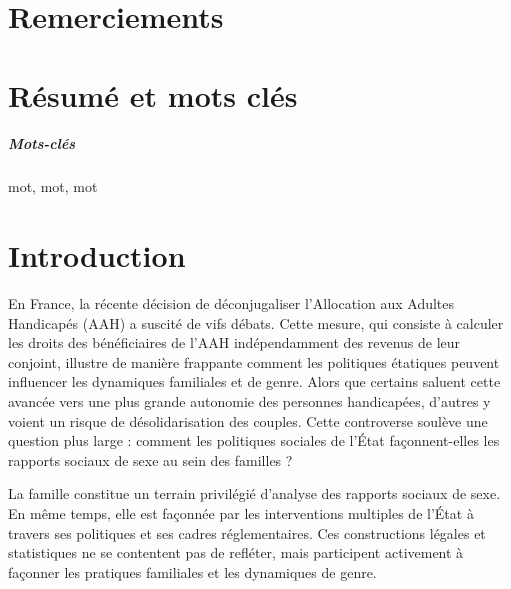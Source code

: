 \documentclass[
  12pt,
]{book}
\author{}
\date{\vspace{-2.5em}}
\begin{document}
\frontmatter

\mainmatter
\makethesistitle

\thispagestyle{empty}

\chapter*{Remerciements}
\blindtext

\chapter*{Résumé et mots clés}
\blindtext
\paragraph{Mots-clés}

mot, mot, mot

\tableofcontents
{}

\newpage

\chapter{Introduction}\label{introduction}

En France, la récente décision de déconjugaliser l'Allocation aux
Adultes Handicapés (AAH) a suscité de vifs débats. Cette mesure, qui
consiste à calculer les droits des bénéficiaires de l'AAH indépendamment
des revenus de leur conjoint, illustre de manière frappante comment les
politiques étatiques peuvent influencer les dynamiques familiales et de
genre. Alors que certains saluent cette avancée vers une plus grande
autonomie des personnes handicapées, d'autres y voient un risque de
désolidarisation des couples. Cette controverse soulève une question
plus large : comment les politiques sociales de l'État façonnent-elles
les rapports sociaux de sexe au sein des familles ?

La famille constitue un terrain privilégié d'analyse des rapports
sociaux de sexe. En même temps, elle est façonnée par les interventions
multiples de l'État à travers ses politiques et ses cadres
réglementaires. Ces constructions légales et statistiques ne se
contentent pas de refléter, mais participent activement à façonner les
pratiques familiales et les dynamiques de genre.
\end{document}
